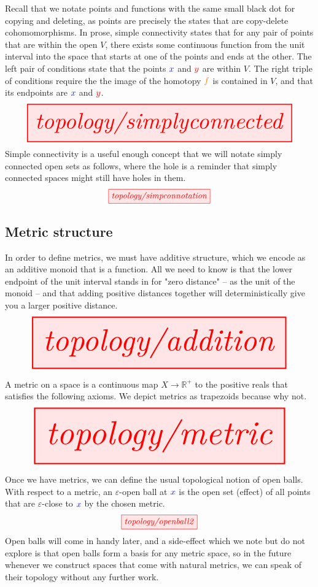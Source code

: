 \clearpage

\begin{example}\label{def:simpconn}
Recall that we notate points and functions with the same small black dot for copying and deleting, as points are precisely the states that are copy-delete cohomomorphisms. In prose, simple connectivity states that for any pair of points that are within the open $V$, there exists some continuous function from the unit interval into the space that starts at one of the points and ends at the other. The left pair of conditions state that the points $\textcolor{blue}{x}$ and $\textcolor{red}{y}$ are within $V$. The right triple of conditions require the the image of the homotopy $\textcolor{orange}{f}$ is contained in $V$, and that its endpoints are $\textcolor{blue}{x}$ and $\textcolor{red}{y}$.
\[\resizebox{\textwidth}{!}{\tikzfig{topology/simplyconnected}}\]
Simple connectivity is a useful enough concept that we will notate simply connected open sets as follows, where the hole is a reminder that simply connected spaces might still have holes in them.
\[\tikzfig{topology/simpconnotation}\]
\end{example}

\clearpage

\subsection{Metric structure}

\begin{defn}[Addition]\label{def:addition}
In order to define metrics, we must have additive structure, which we encode as an additive monoid that is a function. All we need to know is that the lower endpoint of the unit interval stands in for "zero distance" -- as the unit of the monoid -- and that adding positive distances together will deterministically give you a larger positive distance.
\[\resizebox{\textwidth}{!}{\tikzfig{topology/addition}}\]
\end{defn}

\begin{defn}[Metric]\label{def:metric}
A metric on a space is a continuous map $X \rightarrow \mathbb{R}^+$ to the positive reals that satisfies the following axioms. We depict metrics as trapezoids because why not.
\[\resizebox{\textwidth}{!}{\tikzfig{topology/metric}}\]
\end{defn}

\clearpage

\begin{example}\label{def:openball}
Once we have metrics, we can define the usual topological notion of open balls. With respect to a metric, an $\varepsilon$-open ball at $\textcolor{blue}{x}$ is the open set (effect) of all points that are $\varepsilon$-close to $\textcolor{blue}{x}$ by the chosen metric.
\[\tikzfig{topology/openball2}\]
Open balls will come in handy later, and a side-effect which we note but do not explore is that open balls form a basis for any metric space, so in the future whenever we construct spaces that come with natural metrics, we can speak of their topology without any further work.
\end{example}

